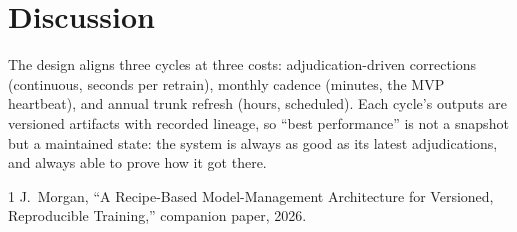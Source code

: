 \documentclass[conference]{IEEEtran}
\begin{document}
\section{Discussion}
The design aligns three cycles at three costs: adjudication-driven corrections (continuous, seconds per retrain), monthly cadence (minutes, the MVP heartbeat), and annual trunk refresh (hours, scheduled). Each cycle's outputs are versioned artifacts with recorded lineage, so ``best performance'' is not a snapshot but a maintained state: the system is always as good as its latest adjudications, and always able to prove how it got there.

\begin{thebibliography}{1}
 J.~Morgan, ``A Recipe-Based Model-Management Architecture for Versioned, Reproducible Training,'' companion paper, 2026.
\end{thebibliography}
\end{document}
